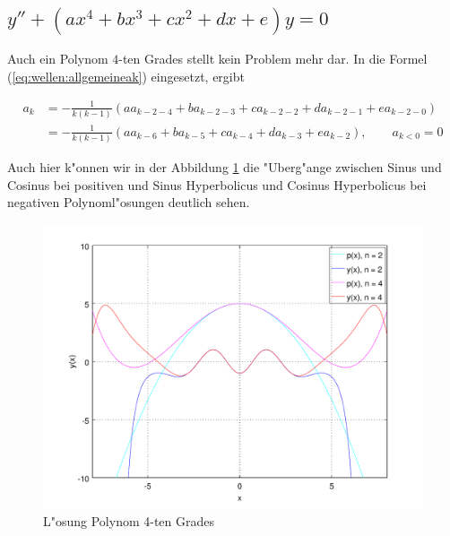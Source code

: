 \subsection{\texorpdfstring{$y''+(ax^4+bx^3+cx^2+dx+e)y = 
0$}{y''-(ax4+bx3+cx2+dx+e)y = 0}}

Auch ein Polynom $4$-ten Grades stellt kein Problem mehr dar. In die 
Formel (\ref{eq:wellen:allgemeineak}) eingesetzt, ergibt

\begin{equation*}
	\begin{split}
		a_k &= -\frac{1}{k(k-1)} (aa_{k-2-4} + 
		ba_{k-2-3} + ca_{k-2-2} + da_{k-2-1} +ea_{k-2-0})
		\\
		&= -\frac{1}{k(k-1)} (aa_{k-6} + ba_{k-5} + 
		ca_{k-4} + da_{k-3} +ea_{k-2}), \qquad a_{k<0} = 0
	\end{split}
\end{equation*}

Auch hier k"onnen wir in der Abbildung \ref{fig:wellen:poly4-dgl} die 
"Uberg"ange zwischen Sinus und Cosinus bei positiven und Sinus Hyperbolicus und 
Cosinus Hyperbolicus bei negativen Polynoml"osungen deutlich sehen.

\begin{figure}
	\includegraphics[scale=0.65]{./wellen/images/allgemein/n4.pdf}
	\caption{L"osung Polynom 4-ten Grades}
	\label{fig:wellen:poly4-dgl}
\end{figure}
